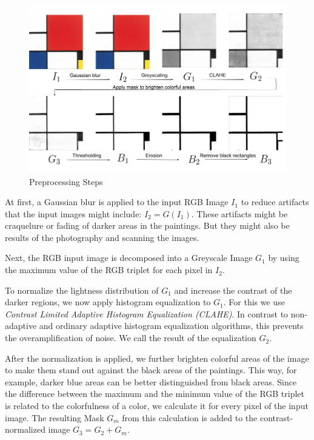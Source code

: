 \begin{figure}
  \includegraphics[width=\linewidth]{preprocessing_steps.png}
  \caption{Preprocessing Steps}
  \label{fig:preprocessing}
\end{figure}

At first, a Gaussian blur is applied to the input RGB Image
$I_1$ to reduce artifacts that the input images might include: $I_2 = G(I_1)$.
These artifacts might be craquelure or fading of darker areas in the paintings.
But they might also be results of the photography and scanning the images.

Next, the RGB input image is decomposed into a Greyscale Image $G_1$ by using
the maximum value of the RGB triplet for each pixel in $I_2$.

To normalize the lightness distribution of $G_1$ and increase the contrast of
the darker regions, we now apply histogram equalization to $G_1$. For this we
use \textit{Contrast Limited Adaptive Histogram Equalization (CLAHE)}. In
contrast to non-adaptive and ordinary adaptive histogram equalization
algorithms, this prevents the overamplification of noise. We call the result of
the equalization $G_2$. \cite{Pizer1987}

After the normalization is applied, we further brighten colorful areas of the
image to make them stand out against the black areas of the paintings. This way,
for example, darker blue areas can be better distinguished from black areas.
Since the difference between the maximum and the minimum value of the RGB
triplet is related to the colorfulness of a color, we calculate it for every
pixel of the input image. The resulting Mask $G_m$ from this calculation is added to
the contrast-normalized image $G_3 = G_2 + G_m$.

